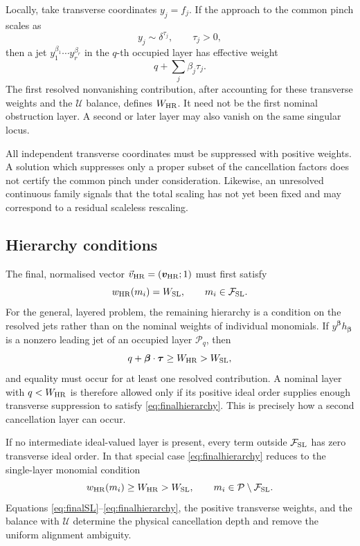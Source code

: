 \documentclass[a4paper,11pt]{article}
\newcommand{\HR}{\mathrm{HR}}
\newcommand{\FSL}{\mathcal F_{\rm SL}}
\newcommand{\WSL}{W_{\rm SL}}
\newcommand{\WHR}{W_{\rm HR}}
\newcommand{\vHR}{\vec v_{\rm HR}}
\begin{document}
Locally, take transverse coordinates \(y_j=f_j\).  If the approach to the
common pinch scales as
\begin{equation}
 y_j\sim\delta^{\tau_j},
 \qquad \tau_j>0,
\label{eq:transverseweights}
\end{equation}
then a jet \(y_1^{\beta_1}\cdots y_r^{\beta_r}\) in the \(q\)-th occupied
layer has effective weight
\begin{equation}
 q+\sum_j\beta_j\tau_j.
\label{eq:effectiveweight}
\end{equation}
The first resolved nonvanishing contribution, after accounting for these
transverse weights and the \(\mathcal U\) balance, defines \(\WHR\).  It need
not be the first nominal obstruction layer.  A second or later layer may
also vanish on the same singular locus.

All independent transverse coordinates must be suppressed with positive
weights.  A solution which suppresses only a proper subset of the
cancellation factors does not certify the common pinch under consideration.
Likewise, an unresolved continuous family signals that the total scaling has
not yet been fixed and may correspond to a residual scaleless rescaling.

\subsection{Hierarchy conditions}

The final, normalised vector \(\vHR=(\boldsymbol v_{\HR};1)\) must first
satisfy
\begin{equation}
 w_{\HR}(m_i)=\WSL,
 \qquad m_i\in\FSL.
\label{eq:finalSL}
\end{equation}
For the general, layered problem, the remaining hierarchy is a condition on
the resolved jets rather than on the nominal weights of individual
monomials.  If \(y^{\boldsymbol\beta}h_{\boldsymbol\beta}\) is a nonzero
leading jet of an occupied layer \(\mathcal P_q\), then
\begin{equation}
 q+\boldsymbol\beta\cdot\boldsymbol\tau
 \geq\WHR>\WSL,
\label{eq:finalhierarchy}
\end{equation}
and equality must occur for at least one resolved contribution.  A nominal
layer with \(q<\WHR\) is therefore allowed only if its positive ideal order
supplies enough transverse suppression to satisfy
\eqref{eq:finalhierarchy}.  This is precisely how a second cancellation
layer can occur.

If no intermediate ideal-valued layer is present, every term outside
\(\FSL\) has zero transverse ideal order.  In that special case
\eqref{eq:finalhierarchy} reduces to the single-layer monomial condition
\begin{equation}
 w_{\HR}(m_i)\geq\WHR>\WSL,
 \qquad m_i\in\mathcal P\setminus\FSL.
\label{eq:single-layer-hierarchy}
\end{equation}
Equations \eqref{eq:finalSL}--\eqref{eq:finalhierarchy}, the positive
transverse weights, and the balance with \(\mathcal U\) determine the
physical cancellation depth and remove the uniform alignment ambiguity.
\end{document}
